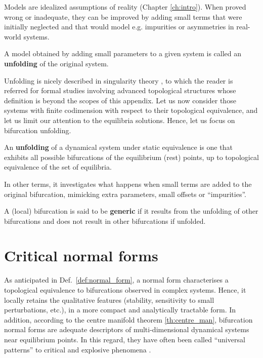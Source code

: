 Models are idealized assumptions of reality (Chapter \ref{ch:intro}). When proved wrong or inadequate, they can be improved by adding small terms that were initially neglected and that would model e.g. impurities or asymmetries in real-world systems.
\begin{definition}
	A model obtained by adding small parameters to a given system is called an \textbf{unfolding} of the original system.
	\label{def:unfolding}
\end{definition}
Unfolding is nicely described in singularity theory \citep{Golubitsky2003a,kuznetsov2013elements}, to which the reader is referred for formal studies involving advanced topological structures whose definition is beyond the scopes of this appendix. Let us now consider those systems with finite codimension with respect to their topological equivalence, and let us limit our attention to the equilibria solutions. Hence, let us focus on bifurcation unfolding.
\begin{definition}
	\label{def:unfoding}
	An \textbf{unfolding} of a dynamical system under static equivalence is one that exhibits all possible bifurcations of the equilibrium (rest) points, up to topological equivalence of the set of equilibria.
\end{definition}
In other terms, it investigates what happens when small terms are added to the original bifurcation, mimicking extra parameters, small offsets or ``impurities''.
\begin{definition}
	A (local) bifurcation is said to be \textbf{generic} if it results from the unfolding of other bifurcations and does not result in other bifurcations if unfolded.
	\label{def:generic_bif}
\end{definition}





\tocless\section{Critical normal forms}
\label{sec:normal_form}


As anticipated in Def.~\ref{def:normal_form}, a normal form characterises a topological equivalence to bifurcations observed in complex systems. Hence, it locally retains the qualitative features (stability, sensitivity to small perturbations, etc.), in a more compact and analytically tractable form. In addition, according to the centre manifold theorem \ref{th:centre_man}, bifurcation normal forms are adequate descriptors of multi-dimensional dynamical systems near equilibrium points. In this regard, they have often been called ``universal patterns'' to critical and explosive phenomena \citep{Thom2554,Kuehn2021}.

